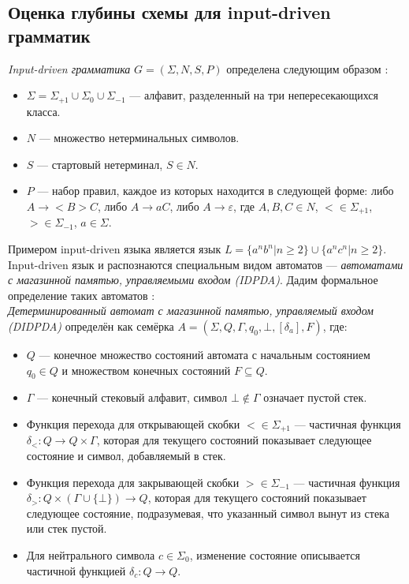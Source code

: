 \documentclass{spbau-diploma}
\begin{document}
\subsection{Оценка глубины схемы для input-driven грамматик}
\textit{Input-driven грамматика} $G = ( \Sigma, N, S, P)$ определена следующим образом \cite{IDGrammar}:
\begin{itemize}
	\item $\Sigma = \Sigma_{+1} \cup \Sigma_0 \cup \Sigma_{-1}$ --- алфавит, разделенный на три непересекающихся класса.
	\item $N$ --- множество нетерминальных символов.
         \item $S$ --- стартовый нетерминал, $S \in N$.
	\item $P$ --- набор правил, каждое из которых находится в следующей форме: либо $A \rightarrow <B>C$, либо $A \rightarrow aC$, либо $A \rightarrow \varepsilon$,  где $A, B, C \in N$,  $< \in \Sigma_{+1}$, $> \in  \Sigma_{-1}$, $a \in \Sigma$.
\end{itemize}
Примером input-driven языка является язык $L = \{a^nb^n | n \ge 2\} \cup \{a^nc^n | n \ge 2\}$.
\\Input-driven язык и распознаются специальным видом автоматов --- \textit{автоматами с магазинной памятью, управляемыми входом (IDPDA)}. Дадим формальное определение таких автоматов \cite{OkhotinIDPDA}:
\\
\textit{Детерминированный автомат с магазинной памятью, управляемый входом (DIDPDA)} определён как семёрка $A = (\Sigma, Q, \Gamma, q_0, \bot, [\delta_a], F)$, где: 
\begin{itemize}
	\item $Q$ --- конечное множество состояний автомата с начальным состоянием $q_0 \in Q$ и множеством конечных состояний $F  \subseteq Q$.
	\item $\Gamma$ --- конечный стековый алфавит, символ $\bot \not\in \Gamma$ означает пустой стек. 
         \item Функция перехода  для открывающей скобки $< \in \Sigma_{+1}$  --- частичная функция $\delta_<: Q \rightarrow Q \times \Gamma$, которая для текущего состояний показывает следующее состояние и символ, добавляемый в стек.
         \item Функция перехода  для закрывающей скобки $> \in \Sigma_{-1}$  --- частичная функция $\delta_>: Q \times (\Gamma \cup \{ \bot \}) \rightarrow Q$, которая для текущего состояний показывает следующее состояние,  подразумевая, что указанный символ вынут из стека или стек пустой.
	\item Для нейтрального символа $c \in \Sigma_0$, изменение состояние описывается частичной функцией $\delta_c: Q \rightarrow Q$.
\end{itemize}
\end{document}
